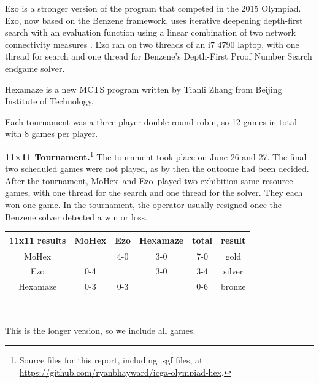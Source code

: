 \documentclass{icga}
\newif\iflong\longtrue  %
\def\Eo{\mbox{\sc Ezo}}
\def\Hz{\mbox{\sc Hexamaze}}
\def\Mx{\mbox{\sc MoHex}}
\begin{document}
\Eo{} is a stronger version of the program that competed in the 2015 Olympiad.
\Eo{}, now based on the Benzene framework, 
uses iterative deepening depth-first search 
with an evaluation function using a linear combination of
two network connectivity measures .
\Eo{} ran on two threads of an i7 4790 laptop,
with one thread for search and one thread for
Benzene's Depth-First Proof Number Search endgame solver.

\Hz{} is a new MCTS program written by Tianli Zhang from 
Beijing Institute of Technology.

Each tournament was a three-player double round robin, so 12 games
in total with 8 games per player.

{\large\bf 11$\times$11 Tournament.}\footnote{Source files for this report, including .sgf files, at \url{https://github.com/ryanbhayward/icga-olympiad-hex}.}
The tournment took place on June 26 and 27.
The final two scheduled games were not played,
as by then the outcome had been decided.
After the tournament, \Mx\ and \Eo\ played two 
exhibition same-resource games,
with one thread for the search and one
thread for the solver. They each won one game.
In the tournament, the operator usually resigned
once the Benzene solver detected a win or loss.

\hfill\begin{tabular}{|c|c|c|c|c|c|}
\hline 11x11 results &\Mx{} &\Eo{}  & \Hz{}  & total & result \\ 
\hline \Mx{}         &      &  4-0  &  3-0   & 7-0  &  gold \\
\hline \Eo{}         &  0-4 &       &  3-0   & 3-4  &  silver \\
\hline \Hz{}         &  0-3 &  0-3  &        & 0-6  &  bronze \\
\hline
\end{tabular}\hfill~

\iflong
This is the longer version, so we include all games.
\fi
\end{document}
